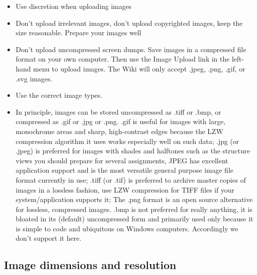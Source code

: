 \documentclass[]{book}
\providecommand{\tightlist}{%
  \setlength{\itemsep}{0pt}\setlength{\parskip}{0pt}}
\begin{document}
\begin{itemize}
\tightlist
\item
  Use discretion when uploading images
\item
  Don't upload irrelevant images, don't upload copyrighted images, keep
  the size reasonable. Prepare your images well
\item
  Don't upload uncompressed screen dumps. Save images in a compressed
  file format on your own computer. Then use the Image Upload link in
  the left-hand menu to upload images. The Wiki will only accept .jpeg,
  .png, .gif, or .svg images.
\item
  Use the correct image types.
\item
  In principle, images can be stored uncompressed as .tiff or .bmp, or
  compressed as .gif or .jpg or .png. .gif is useful for images with
  large, monochrome areas and sharp, high-contrast edges because the LZW
  compression algorithm it uses works especially well on such data; .jpg
  (or .jpeg) is preferred for images with shades and halftones such as
  the structure views you should prepare for several assignments, JPEG
  has excellent application support and is the most versatile general
  purpose image file format currently in use; .tiff (or .tif) is
  preferred to archive master copies of images in a lossless fashion,
  use LZW compression for TIFF files if your system/application supports
  it; The .png format is an open source alternative for lossless,
  compressed images. .bmp is not preferred for really anything, it is
  bloated in its (default) uncompressed form and primarily used only
  because it is simple to code and ubiquitous on Windows computers.
  Accordingly we don't support it here.
\end{itemize}

\subsection{Image dimensions and
resolution}\label{image-dimensions-and-resolution}
\end{document}
